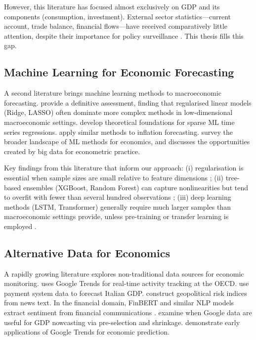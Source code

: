 However, this literature has focused almost exclusively on GDP and its components (consumption, investment).  External sector statistics---current account, trade balance, financial flows---have received comparatively little attention, despite their importance for policy surveillance \citep{obstfeld2012does}.  This thesis fills this gap.

\subsection*{Machine Learning for Economic Forecasting}

A second literature brings machine learning methods to macroeconomic forecasting.  \citet{gouletcoulombe2022how} provide a definitive assessment, finding that regularised linear models (Ridge, LASSO) often dominate more complex methods in low-dimensional macroeconomic settings.  \citet{babii2022machine} develop theoretical foundations for sparse ML time series regressions.  \citet{medeiros2021forecasting} apply similar methods to inflation forecasting.  \citet{athey2019machine} survey the broader landscape of ML methods for economics, and \citet{varian2014big} discusses the opportunities created by big data for econometric practice.

Key findings from this literature that inform our approach: (i) regularisation is essential when sample sizes are small relative to feature dimensions \citep{hoerl1970ridge, tibshirani1996regression}; (ii) tree-based ensembles (XGBoost, Random Forest) can capture nonlinearities but tend to overfit with fewer than several hundred observations \citep{chen2016xgboost}; (iii) deep learning methods (LSTM, Transformer) generally require much larger samples than macroeconomic settings provide, unless pre-training or transfer learning is employed \citep{hochreiter1997long, lim2021temporal}.

\subsection*{Alternative Data for Economics}

A rapidly growing literature explores non-traditional data sources for economic monitoring.  \citet{woloszko2020tracking} uses Google Trends for real-time activity tracking at the OECD.  \citet{aprigliano2019using} use payment system data to forecast Italian GDP.  \citet{caldara2022measuring} construct geopolitical risk indices from news text.  In the financial domain, FinBERT \citep{araci2019finbert} and similar NLP models extract sentiment from financial communications \citep{shapiro2022measuring, hansen2016shocking}.  \citet{ferrara2022high} examine when Google data are useful for GDP nowcasting via pre-selection and shrinkage.  \citet{choi2012predicting} demonstrate early applications of Google Trends for economic prediction.


